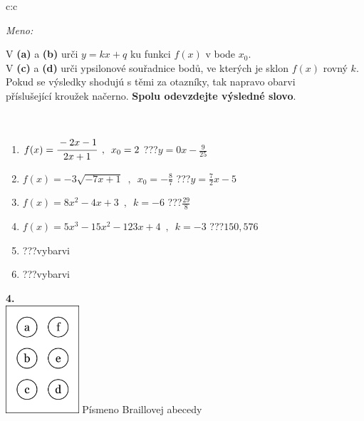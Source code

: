 \documentclass[10pt]{report}
\begin{document}
\begin{tabular}{c:c}
\begin{minipage}[c][104.5mm][t]{0.5\linewidth}
\begin{center}
\textit{Meno:}\phantom{xxxxxxxxxxxxxxxxxxxxxxxxxxxxxxxxxxxxxxxxxxxxxxxxxxxxxxxxxxxxxxxxx}\\[5mm]
\begin{minipage}{0.95\linewidth}
\begin{center}
V \textbf{(a)} a \textbf{(b)} urči  $y = kx + q$ ku funkci $f(x)$ v bode $x_0$.\\V \textbf{(c)} a \textbf{(d)} urči ypsilonové souřadnice bodů, ve kterých je sklon $f(x)$ rovný $k$.\\Pokud se výsledky shodujú s těmi za otazníky, tak napravo obarvi\\příslušející kroužek načerno. \textbf{Spolu odevzdejte výsledné slovo}.
\end{center}
\end{minipage}
\\[1mm]
\begin{minipage}{0.79\linewidth}
\begin{center}
\begin{varwidth}{\linewidth}
\begin{enumerate}
\small
\item $f(x)=\cfrac{-2x-1}{2x+1}\enspace , \enspace x_0=2$\quad \dotfill\; ???\;\dotfill \quad $y = 0x-\frac{9}{25}$
\item $f(x)=-3\sqrt{-7x+1}\enspace , \enspace x_0=-\frac{8}{7}$\quad \dotfill\; ???\;\dotfill \quad $y = \frac{7}{2}x-5$
\item $f(x)=8x^2-4x+3\enspace , \enspace k=-6$\quad \dotfill\; ???\;\dotfill \quad $\frac{29}{8}$
\item $f(x)=5x^3-15x^2-123x+4\enspace , \enspace k=-3$\quad \dotfill\; ???\;\dotfill \quad $150 , 576$
\item \quad \dotfill\; ???\;\dotfill \quad vybarvi
\item \quad \dotfill\; ???\;\dotfill \quad vybarvi
\end{enumerate}
\end{varwidth}
\end{center}
\end{minipage}
\begin{minipage}{0.20\linewidth}
\begin{center}
{\Huge\bfseries 4.} \\[2mm]
\includegraphics[height=40mm]{../images/braille.png}
{\small Písmeno Braillovej abecedy}
\end{center}
\end{minipage}
\end{center}
\end{minipage}
%
\end{tabular}
\end{document}

